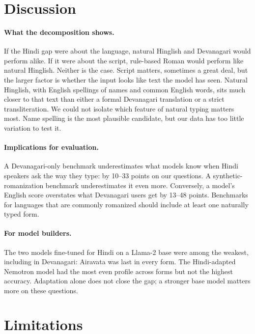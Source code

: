 \documentclass[11pt]{article}
\newcommand{\Dev}{Devanagari}
\newcommand{\Rom}{rule-based Roman}
\newcommand{\Hng}{natural Hinglish}
\begin{document}
\section{Discussion}

\paragraph{What the decomposition shows.}
If the Hindi gap were about the language, \Hng{} and \Dev{} would perform alike.
If it were about the script, \Rom{} would perform like \Hng{}.
Neither is the case.
Script matters, sometimes a great deal, but the larger factor is whether the input looks like text the model has seen.
Natural Hinglish, with English spellings of names and common English words, sits much closer to that text than either a formal Devanagari translation or a strict transliteration.
We could not isolate which feature of natural typing matters most.
Name spelling is the most plausible candidate, but our data has too little variation to test it.

\paragraph{Implications for evaluation.}
A Devanagari-only benchmark underestimates what models know when Hindi speakers ask the way they type: by 10--33 points on our questions.
A synthetic-romanization benchmark underestimates it even more.
Conversely, a model's English score overstates what Devanagari users get by 13--48 points.
Benchmarks for languages that are commonly romanized should include at least one naturally typed form.

\paragraph{For model builders.}
The two models fine-tuned for Hindi on a Llama-2 base were among the weakest, including in Devanagari: Airavata was last in every form.
The Hindi-adapted Nemotron model had the most even profile across forms but not the highest accuracy.
Adaptation alone does not close the gap; a stronger base model matters more on these questions.

\section{Limitations}
\end{document}
